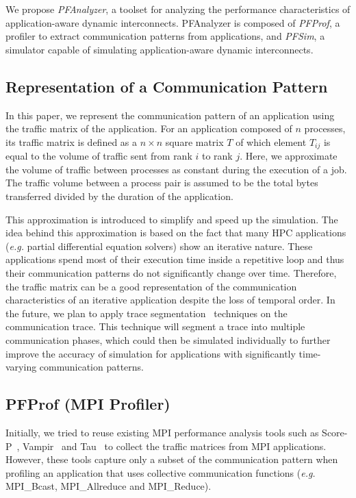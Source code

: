 We propose \emph{PFAnalyzer}, a toolset for analyzing the performance
characteristics of application-aware dynamic interconnects. PFAnalyzer
is composed of \emph{PFProf}, a profiler to extract communication
patterns from applications, and \emph{PFSim}, a simulator capable of
simulating application-aware dynamic interconnects.

\subsection{Representation of a Communication Pattern}

In this paper, we represent the communication pattern of an application
using the traffic matrix of the application. For an application composed
of \(n\) processes, its traffic matrix is defined as a \(n \times n\)
square matrix \(T\) of which element \(T_{ij}\) is equal to the volume
of traffic sent from rank \(i\) to rank \(j\). Here, we approximate the
volume of traffic between processes as constant during the execution of
a job. The traffic volume between a process pair is assumed to be the
total bytes transferred divided by the duration of the application.

This approximation is introduced to simplify and speed up the
simulation. The idea behind this approximation is based on the fact that
many HPC applications (\emph{e.g.} partial differential equation
solvers) show an iterative nature. These applications spend most of
their execution time inside a repetitive loop and thus their
communication patterns do not significantly change over time. Therefore,
the traffic matrix can be a good representation of the communication
characteristics of an iterative application despite the loss of temporal
order. In the future, we plan to apply trace
segmentation~\autocite{Alawneh2016} techniques on the communication
trace. This technique will segment a trace into multiple communication
phases, which could then be simulated individually to further improve
the accuracy of simulation for applications with significantly
time-varying communication patterns.

\subsection{PFProf (MPI Profiler)}\label{sec:ii-pfprof}

Initially, we tried to reuse existing MPI performance analysis tools
such as \mbox{Score-P}~\autocite{Knupfer2012},
Vampir~\autocite{Knupfer2008} and Tau~\autocite{Shende2006} to collect
the traffic matrices from MPI applications. However, these tools capture
only a subset of the communication pattern when profiling an application
that uses collective communication functions (\emph{e.g.} MPI\_Bcast,
MPI\_Allreduce and MPI\_Reduce).

